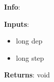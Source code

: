 \textbf{Info}:

\noindent \textbf{Inputs}:
\begin{itemize}
\item{long dep}
\item{long step}
\end{itemize}

\noindent \textbf{Returns}: void
